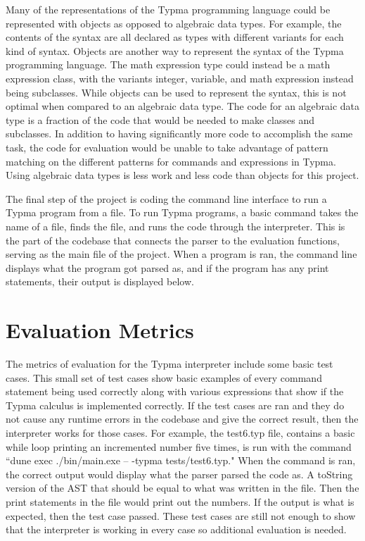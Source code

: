 \documentclass[10pt,twocolumn]{article}
\begin{document}
Many of the representations of the Typma programming language could be represented with objects as opposed to algebraic data types. For example, the contents of the syntax are all declared as types with different variants for each kind of syntax. Objects are another way to represent the syntax of the Typma programming language. The math expression type could instead be a math expression class, with the variants integer, variable, and math expression instead being subclasses. While objects can be used to represent the syntax, this is not optimal when compared to an algebraic data type. The code for an algebraic data type is a fraction of the code that would be needed to make classes and subclasses. In addition to having significantly more code to accomplish the same task, the code for evaluation would be unable to take advantage of pattern matching on the different patterns for commands and expressions in Typma. Using algebraic data types is less work and less code than objects for this project.

The final step of the project is coding the command line interface to run a Typma program from a file. To run Typma programs, a basic command takes the name of a file, finds the file, and runs the code through the interpreter. This is the part of the codebase that connects the parser to the evaluation functions, serving as the main file of the project. When a program is ran, the command line displays what the program got parsed as, and if the program has any print statements, their output is displayed below.

\section{Evaluation Metrics} 
The metrics of evaluation for the Typma interpreter include some basic test cases. This small set of test cases show basic examples of every command statement being used correctly along with various expressions that show if the Typma calculus is implemented correctly. If the test cases are ran and they do not cause any runtime errors in the codebase and give the correct result, then the interpreter works for those cases. For example, the test6.typ file, contains a basic while loop printing an incremented number five times, is run with the command ``dune exec ./bin/main.exe -- -typma tests/test6.typ." When the command is ran, the correct output would display what the parser parsed the code as. A toString version of the AST that should be equal to what was written in the file. Then the print statements in the file would print out the numbers. If the output is what is expected, then the test case passed. These test cases are still not enough to show that the interpreter is working in every case so additional evaluation is needed.
\end{document}
